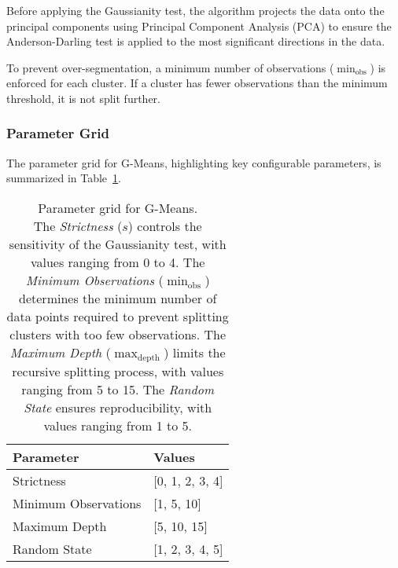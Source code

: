 Before applying the Gaussianity test, the algorithm projects the data onto the principal components using Principal Component
Analysis (PCA) to ensure the Anderson-Darling test is applied to the most significant directions in the data.

To prevent over-segmentation, a minimum number of observations (\(\min_{\text{obs}}\)) is enforced for each cluster.
If a cluster has fewer observations than the minimum threshold, it is not split further.

\subsubsection*{Parameter Grid}

The parameter grid for G-Means, highlighting key configurable parameters, is summarized in Table~\ref{tab:gmeansparams}.

\begin{table}[h!]
\centering

\begin{tabularx}{\columnwidth}{|X|X|}
\hline
\textbf{Parameter} & \textbf{Values} \\ \hline
Strictness & [0, 1, 2, 3, 4] \\ \hline
Minimum Observations & [1, 5, 10] \\ \hline
Maximum Depth & [5, 10, 15] \\ \hline
Random State & [1, 2, 3, 4, 5] \\ \hline
\end{tabularx}
\caption{
    Parameter grid for G-Means.\\ 
    The \textit{Strictness} ($s$) controls the sensitivity of the Gaussianity test, with values ranging from 0 to 4.
    The \textit{Minimum Observations} ($\min_{\text{obs}}$) determines the minimum number of data points required to prevent splitting clusters with too few observations.
    The \textit{Maximum Depth} ($\max_{\text{depth}}$) limits the recursive splitting process, with values ranging from 5 to 15.
    The \textit{Random State} ensures reproducibility, with values ranging from 1 to 5.
}
\label{tab:gmeansparams}
\end{table}




